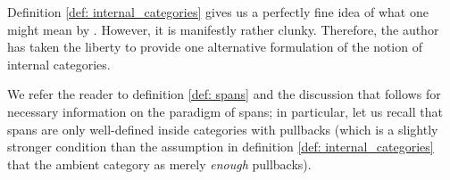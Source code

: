             \begin{remark}
                    
            \end{remark}
            
            \begin{remark} \label{remark: internal_categories_alt_def}
                Definition \ref{def: internal_categories} gives us a perfectly fine idea of what one might mean by . However, it is manifestly rather clunky. Therefore, the author has taken the liberty to provide one alternative formulation of the notion of internal categories.
                
                We refer the reader to definition \ref{def: spans} and the discussion that follows for necessary information on the paradigm of spans; in particular, let us recall that spans are only well-defined inside categories with pullbacks (which is a slightly stronger condition than the assumption in definition \ref{def: internal_categories} that the ambient category as merely \textit{enough} pullbacks). 
                    

\end{remark}

